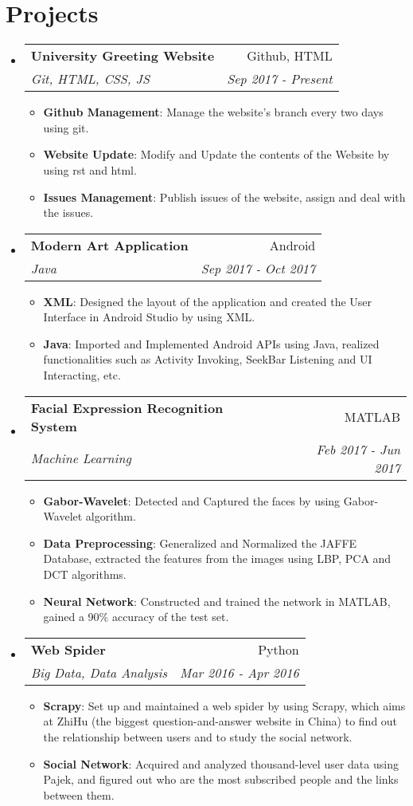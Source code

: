 \documentclass[letterpaper,11pt]{article}
\makeatletter
\newcommand{\resumeItem}[2]{
  \item\small{
    \textbf{#1}{: #2 \vspace{-2pt}}
  }
}
\newcommand{\resumeSubheading}[4]{
  \vspace{-1pt}\item
    \begin{tabular*}{0.97\textwidth}{l@{\extracolsep{\fill}}r}
      \textbf{#1} & #2 \\
      \textit{\small#3} & \textit{\small #4} \\
    \end{tabular*}\vspace{-5pt}
}
\newcommand{\resumeSubHeadingListStart}{\begin{itemize}[leftmargin=*]}
\newcommand{\resumeSubHeadingListEnd}{\end{itemize}}
\newcommand{\resumeItemListStart}{\begin{itemize}}
\newcommand{\resumeItemListEnd}{\end{itemize}\vspace{-5pt}}
\makeatother
\begin{document}
  
\section{Projects}
  \resumeSubHeadingListStart
  
      \resumeSubheading
      	{University Greeting Website}{Github, HTML}
	{Git, HTML, CSS, JS}{Sep 2017 - Present}
	\resumeItemListStart
	  \resumeItem{Github Management}
	  {Manage the website's branch every two days using git.}
	  \resumeItem{Website Update}
	  {Modify and Update the contents of the Website by using rst and html.}
	  \resumeItem{Issues Management}
	  {Publish issues of the website, assign and deal with the issues.}
	\resumeItemListEnd
	
	\resumeSubheading
	  {Modern Art Application}{Android}
	  {Java}{Sep 2017 - Oct 2017}
	  \resumeItemListStart
	    \resumeItem{XML}
	    {Designed the layout of the application and created the User Interface in Android Studio by using XML.}
	    \resumeItem{Java}
	    {Imported and Implemented Android APIs using Java, realized functionalities such as Activity Invoking, SeekBar Listening and UI Interacting, etc.}
	   \resumeItemListEnd
    
   \resumeSubheading
      {Facial Expression Recognition System}{MATLAB}
      {Machine Learning}{Feb 2017 - Jun 2017}
      \resumeItemListStart
         \resumeItem{Gabor-Wavelet}
          {Detected and Captured the faces by using Gabor-Wavelet algorithm.}
      	\resumeItem{Data Preprocessing}
	 {Generalized and Normalized the JAFFE Database, extracted the features from the images using LBP, PCA and DCT algorithms.}    
        \resumeItem{Neural Network}
          {Constructed and trained the network in MATLAB, gained a 90\% accuracy of the test set.}
      \resumeItemListEnd	      

  
  \resumeSubheading
  	{Web Spider}{Python}
	{Big Data, Data Analysis}{Mar 2016 - Apr 2016}
	\resumeItemListStart
		\resumeItem{Scrapy}
		{Set up and maintained a web spider by using Scrapy, which aims at ZhiHu (the biggest question-and-answer website in China) to find out the relationship between users and to study the social network.}
		\resumeItem{Social Network}
		{Acquired and analyzed thousand-level user data using Pajek, and figured out who are the most subscribed people and the links  between them.}
	\resumeItemListEnd
\resumeSubHeadingListEnd  
\end{document}
